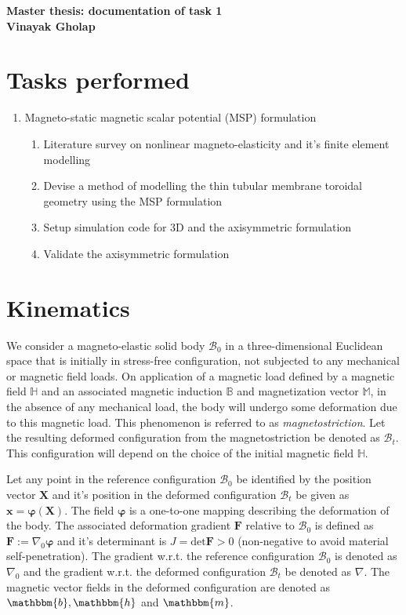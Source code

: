 \documentclass[11pt,a4paper,final]{article}
\begin{document}
\begin{center}
\textbf{\Large Master thesis: documentation of task 1}\\ \vspace{0.25cm}
\textbf{\large Vinayak Gholap}
\end{center}

\section{Tasks performed}
\begin{enumerate}
\item Magneto-static magnetic scalar potential (MSP) formulation
\begin{enumerate}
\item Literature survey on nonlinear magneto-elasticity and it's finite element modelling \cite{dorfmann2004, dorfmann2005, reddy_toroid, barham}
\item Devise a method of modelling the thin tubular membrane toroidal geometry using the MSP formulation 
\item Setup simulation code for 3D and the axisymmetric formulation 
\item Validate the axisymmetric formulation 
\end{enumerate}
\end{enumerate}

\section{Kinematics}
We consider a magneto-elastic solid body $\mathcal{B}_0$ in a three-dimensional Euclidean space that is initially in stress-free configuration, not subjected to any mechanical or magnetic field loads. On application of a magnetic load defined by a magnetic field $\mathbb{H}$ and an associated magnetic induction $\mathbb{B}$ and magnetization vector $\mathbb{M}$, in the absence of any mechanical load, the body will undergo some deformation due to this magnetic load. This phenomenon is referred to as \textit{magnetostriction}. Let the resulting deformed configuration from the magnetostriction be denoted as $\mathcal{B}_t$. This configuration will depend on the choice of the initial magnetic field $\mathbb{H}$. \par 
Let any point in the reference configuration $\mathcal{B}_0$ be identified by the position vector $\mathbf{X}$ and it's position in the deformed configuration $\mathcal{B}_t$ be given as $\mathbf{x} = \bm{\varphi} (\mathbf{X})$. The field $\bm{\varphi}$ is a one-to-one mapping describing the deformation of the body. The associated deformation gradient $\mathbf{F}$ relative to $\mathcal{B}_0$ is defined as $\mathbf{F} := \nabla_0 \bm{\varphi}$ and it's determinant is $J = \text{det}\mathbf{F} > 0$ (non-negative to avoid material self-penetration). The gradient w.r.t. the reference configuration $\mathcal{B}_0$ is denoted as $\nabla_0$ and the gradient w.r.t. the deformed configuration $\mathcal{B}_t$ be denoted as $\nabla$. The magnetic vector fields in the deformed configuration are denoted as $\mathbbm{b}, \mathbbm{h}$ and $\mathbbm{m}$.\par 
\end{document}
